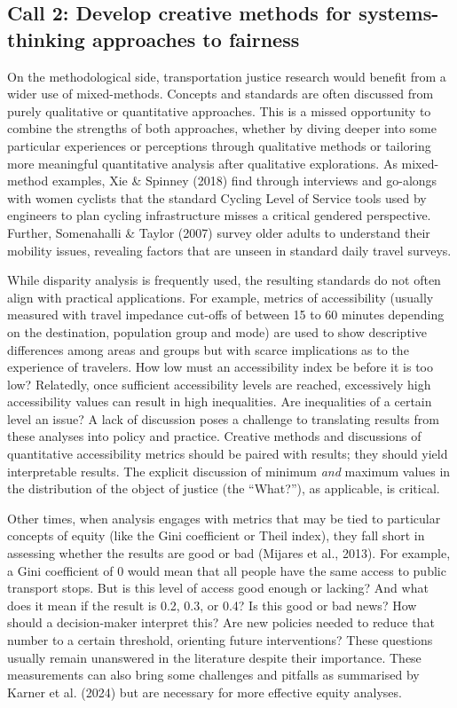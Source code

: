 \documentclass[
  letterpaper,
  DIV=11,
  numbers=noendperiod]{scrartcl}
\begin{document}
\subsection{Call 2: Develop creative methods for systems-thinking
approaches to
fairness}\label{call-2-develop-creative-methods-for-systems-thinking-approaches-to-fairness}

On the methodological side, transportation justice research would
benefit from a wider use of mixed-methods. Concepts and standards are
often discussed from purely qualitative or quantitative approaches. This
is a missed opportunity to combine the strengths of both approaches,
whether by diving deeper into some particular experiences or perceptions
through qualitative methods or tailoring more meaningful quantitative
analysis after qualitative explorations. As mixed-method examples, Xie
\& Spinney (2018) find through interviews and go-alongs with women
cyclists that the standard Cycling Level of Service tools used by
engineers to plan cycling infrastructure misses a critical gendered
perspective. Further, Somenahalli \& Taylor (2007) survey older adults
to understand their mobility issues, revealing factors that are unseen
in standard daily travel surveys.

While disparity analysis is frequently used, the resulting standards do
not often align with practical applications. For example, metrics of
accessibility (usually measured with travel impedance cut-offs of
between 15 to 60 minutes depending on the destination, population group
and mode) are used to show descriptive differences among areas and
groups but with scarce implications as to the experience of travelers.
How low must an accessibility index be before it is too low? Relatedly,
once sufficient accessibility levels are reached, excessively high
accessibility values can result in high inequalities. Are inequalities
of a certain level an issue? A lack of discussion poses a challenge to
translating results from these analyses into policy and practice.
Creative methods and discussions of quantitative accessibility metrics
should be paired with results; they should yield interpretable results.
The explicit discussion of minimum \emph{and} maximum values in the
distribution of the object of justice (the ``What?''), as applicable, is
critical.

Other times, when analysis engages with metrics that may be tied to
particular concepts of equity (like the Gini coefficient or Theil
index), they fall short in assessing whether the results are good or bad
(Mijares et al., 2013). For example, a Gini coefficient of 0 would mean
that all people have the same access to public transport stops. But is
this level of access good enough or lacking? And what does it mean if
the result is 0.2, 0.3, or 0.4? Is this good or bad news? How should a
decision-maker interpret this? Are new policies needed to reduce that
number to a certain threshold, orienting future interventions? These
questions usually remain unanswered in the literature despite their
importance. These measurements can also bring some challenges and
pitfalls as summarised by Karner et al. (2024) but are necessary for
more effective equity analyses.
\end{document}
